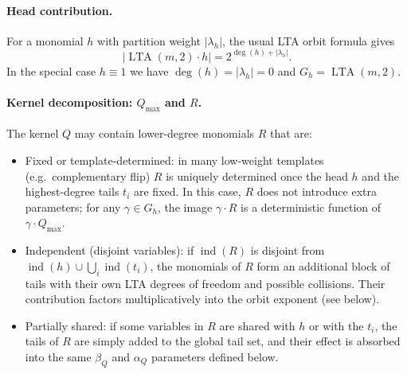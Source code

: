 \documentclass[conference]{IEEEtran}
\theoremstyle{definition}
\DeclareMathOperator{\LTA}{LTA}
\newcommand{\ind}{\operatorname{ind}}
\newcommand{\Stab}{\operatorname{Stab}}
\begin{document}
\paragraph{Head contribution.}
For a monomial $h$ with partition weight $|\lambda_h|$, the usual LTA
orbit formula gives
\[
|\LTA(m,2)\cdot h| = 2^{\deg(h)+|\lambda_h|}.
\]
In the special case $h\equiv1$ we have $\deg(h)=|\lambda_h|=0$ and
$G_h=\LTA(m,2)$.

\paragraph{Kernel decomposition: $Q_{\max}$ and $R$.}
The kernel $Q$ may contain lower-degree monomials $R$ that are:
\begin{itemize}[leftmargin=*, itemsep=0pt]
  \item Fixed or template-determined: 
        in many low-weight templates (e.g.\ complementary flip) $R$ is uniquely determined once the head $h$
        and the highest-degree tails $t_i$ are fixed.  In this case, $R$
        does not introduce extra parameters;  for any
        $\gamma\in G_h$, the image $\gamma\cdot R$ is a
        deterministic function of $\gamma\cdot Q_{\max}$.
  \item Independent (disjoint variables): 
        if $\ind(R)$ is disjoint from $\ind(h)\cup\bigcup_i\ind(t_i)$,
        the monomials of $R$ form an additional block of tails with their
        own LTA degrees of freedom and possible collisions.  Their
        contribution factors multiplicatively into the orbit exponent
        (see below).
  \item Partially shared:
        if some variables in $R$ are shared with $h$ or with the $t_i$,
        the tails of $R$ are simply added to the global tail set, and
        their effect is absorbed into the same $\beta_Q$ and $\alpha_Q$
        parameters defined below.
\end{itemize}
\end{document}
